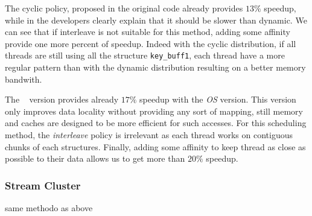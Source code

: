 The cyclic policy, proposed in the original code already provides $13\%$
speedup, while in the developers clearly explain that it should be slower than
dynamic. We can see that if interleave is not suitable for this method, adding
some affinity provide one more percent of speedup. Indeed with the cyclic
distribution, if all threads are still using all the structure
\texttt{key\_buff1}, each thread have a more regular pattern than with the
dynamic distribution resulting on a better memory bandwith.

The \TABARNAC~ version provides already $17\%$ speedup with the
\emph{OS} version. This version only improves data locality without providing
any sort of mapping, still memory and caches are designed to be more efficient
for such accesses. For this scheduling method, the \emph{interleave} policy is
irrelevant as each thread works on contiguous chunks of each structures.
Finally, adding some affinity to keep thread as close as possible to their
data allows us to get more than $20\%$ speedup.


\subsubsection{Stream Cluster}
same methodo as above

